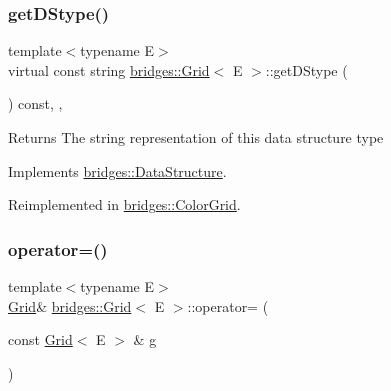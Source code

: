 \mbox{\label{classbridges_1_1_grid_ab701d081de4f7ffafb15966758dd5446}} 
\subsubsection{\texorpdfstring{get\+D\+Stype()}{getDStype()}}
{\footnotesize\ttfamily template$<$typename E$>$ \\
virtual const string \mbox{\hyperlink{classbridges_1_1_grid}{bridges\+::\+Grid}}$<$ E $>$\+::get\+D\+Stype (\begin{DoxyParamCaption}{ }\end{DoxyParamCaption}) const\hspace{0.3cm}{\ttfamily [inline]}, {\ttfamily [override]}, {\ttfamily [virtual]}}

\begin{DoxyReturn}{Returns}
The string representation of this data structure type 
\end{DoxyReturn}


Implements \mbox{\hyperlink{classbridges_1_1_data_structure_a957a63b106e340bc753620c650632bdc}{bridges\+::\+Data\+Structure}}.



Reimplemented in \mbox{\hyperlink{classbridges_1_1_color_grid_a6bb93994dade8e79a197459532dad153}{bridges\+::\+Color\+Grid}}.

\mbox{\label{classbridges_1_1_grid_ad5b960f574d1f5bddfffbfd8ce2d870b}} 
\subsubsection{\texorpdfstring{operator=()}{operator=()}}
{\footnotesize\ttfamily template$<$typename E$>$ \\
\mbox{\hyperlink{classbridges_1_1_grid}{Grid}}\& \mbox{\hyperlink{classbridges_1_1_grid}{bridges\+::\+Grid}}$<$ E $>$\+::operator= (\begin{DoxyParamCaption}\item[{const \mbox{\hyperlink{classbridges_1_1_grid}{Grid}}$<$ E $>$ \&}]{g }\end{DoxyParamCaption})\hspace{0.3cm}{\ttfamily [inline]}}

